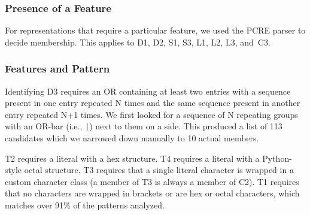 \subsubsection{Presence of a Feature}
For representations that require a particular feature, we used the PCRE parser to decide membership. This applies to D1, D2, S1, S3, L1, L2, L3, and~C3.

%





\subsubsection{Features and Pattern}
Identifying D3 requires an OR containing at least two entries with a sequence present in one entry repeated N times and the same sequence present in another entry repeated N+1 times. We first looked for a sequence of N repeating groups with an OR-bar (i.e., \verb!|!) next to them on a side. This produced a list of 113 candidates which we narrowed down manually to 10 actual members.


T2 requires a literal with a hex structure. %
T4 requires a literal with a %
Python-style octal structure. %
T3 requires that a single literal character is wrapped in a custom character class (a member of T3 is always a member of C2).
T1 requires that no characters are wrapped in brackets or are hex or octal characters, which matches over 91\% of the patterns analyzed.

